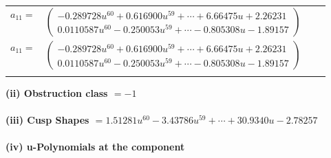 \documentclass[1p]{elsarticle_modified}
\theoremstyle{definition}
\begin{document}
\begin{tabular}{m{7pt} m{180pt} m{7pt} m{180pt} }
\flushright $a_{11}=$&$\begin{pmatrix}-0.289728 u^{60}+0.616900 u^{59}+\cdots+6.66475 u+2.26231\\0.0110587 u^{60}-0.250053 u^{59}+\cdots-0.805308 u-1.89157\end{pmatrix}$\\ \flushright $a_{11}=$&$\begin{pmatrix}-0.289728 u^{60}+0.616900 u^{59}+\cdots+6.66475 u+2.26231\\0.0110587 u^{60}-0.250053 u^{59}+\cdots-0.805308 u-1.89157\end{pmatrix}$\\&\end{tabular}
\flushleft \textbf{(ii) Obstruction class $= -1$}\\~\\
\flushleft \textbf{(iii) Cusp Shapes $= 1.51281 u^{60}-3.43786 u^{59}+\cdots+30.9340 u-2.78257$}\\~\\
\newpage\renewcommand{\arraystretch}{1}
\flushleft \textbf{(iv) u-Polynomials at the component}\newline \\
\end{document}
